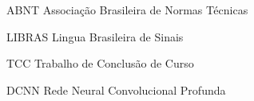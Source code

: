 
\begin{siglas}
    \item[ABNT] Associação Brasileira de Normas Técnicas
    \item[LIBRAS] Lingua Brasileira de Sinais
    \item[TCC] Trabalho de Conclusão de Curso
    \item[DCNN] Rede Neural Convolucional Profunda
\end{siglas}
